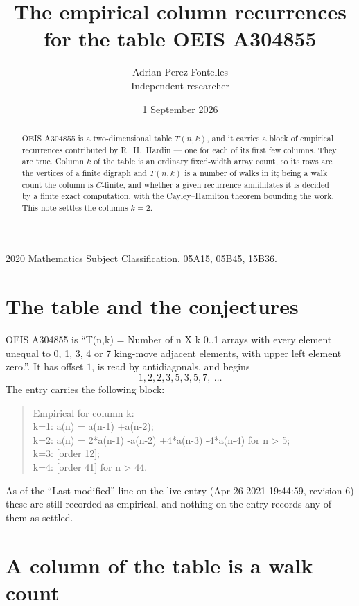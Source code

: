 \documentclass[11pt,a4paper]{article}
\title{The empirical column recurrences for the table OEIS A304855}
\author{Adrian Perez Fontelles\\ \small Independent researcher}
\date{1 September 2026}
\theoremstyle{plain}
\theoremstyle{definition}
\begin{document}
\maketitle

\begin{abstract}
OEIS A304855 is a two-dimensional table $T(n,k)$, and it carries a block of empirical
recurrences contributed by R.~H.~Hardin --- one for each of its first few columns. They are
true. Column $k$ of the table is an ordinary fixed-width array count, so its rows are the
vertices of a finite digraph and $T(n,k)$ is a number of walks in it; being a walk count the
column is $C$-finite, and whether a given recurrence annihilates it is decided by a finite
exact computation, with the Cayley--Hamilton theorem bounding the work. This note settles the columns $k=2$.
\end{abstract}

\noindent\small 2020 Mathematics Subject Classification. 05A15, 05B45, 15B36.\normalsize

\section{The table and the conjectures}

OEIS A304855 is ``T(n,k) = Number of n X k 0..1 arrays with every element unequal to 0, 1, 3, 4 or 7 king-move adjacent elements, with upper left element zero.''. It has offset $1$, is
read by antidiagonals, and begins
\[
1, 2, 2, 3, 5, 3, 5, 7,\ \dots
\]
The entry carries the following block:
\begin{quote}\small
Empirical for column k:\\
k=1: a(n) = a(n-1) +a(n-2);\\
k=2: a(n) = 2*a(n-1) -a(n-2) +4*a(n-3) -4*a(n-4) for n > 5;\\
k=3: [order 12];\\
k=4: [order 41] for n > 44.\\
\end{quote}
As of the ``Last modified'' line on the live entry (Apr 26 2021 19:44:59, revision 6) these are still
recorded as empirical, and nothing on the entry records any of them as settled.

\section{A column of the table is a walk count}
\end{document}
